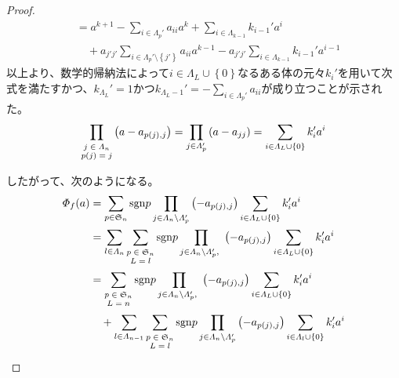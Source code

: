 \documentclass[dvipdfmx]{jsarticle}
\begin{document}
\begin{proof}
\begin{align*}
&= a^{k + 1} - \sum_{i \in \varLambda_{p}'} a_{ii}a^{k} + \sum_{i \in \varLambda_{k - 1}} {k_{i - 1}'a^{i}} \\
&\quad + a_{j'j'}\sum_{i \in \varLambda_{p}' \setminus \left\{ j' \right\}} a_{ii}a^{k - 1} - a_{j'j'}\sum_{i \in \varLambda_{k - 1}} {k_{i - 1}'a^{i - 1}}
\end{align*}
以上より、数学的帰納法によって$i \in \varLambda_{L} \cup \left\{ 0 \right\}$なるある体の元々$k_{i}'$を用いて次式を満たすかつ、$k_{\varLambda_{L}}' = 1$かつ$k_{\varLambda_{L} - 1}' = - \sum_{i \in \varLambda_{p}'} a_{ii}$が成り立つことが示された。
\begin{align*}
\prod_{\scriptsize \begin{matrix} j \in \varLambda_{n} \\ p(j) = j \end{matrix}} \left( a - a_{p(j),j} \right) = \prod_{j \in \varLambda_{p}'} \left( a - a_{jj} \right) = \sum_{i \in \varLambda_{L} \cup \left\{ 0 \right\}} {k_{i}'a^{i}}
\end{align*}\par
したがって、次のようになる。
\begin{align*}
\varPhi_{f}(a) &= \sum_{p \in \mathfrak{S}_{n}} {{\mathrm{sgn} }p\prod_{j \in \varLambda_{n} \setminus \varLambda_{p}'} \left( - a_{p(j),j} \right)\sum_{i \in \varLambda_{L} \cup \left\{ 0 \right\}} {k_{i}'a^{i}}}\\
&= \sum_{l \in \varLambda_{n}} {\sum_{\scriptsize \begin{matrix} p \in \mathfrak{S}_{n} \\ L = l \\\end{matrix}} {{\mathrm{sgn} }p\prod_{j \in \varLambda_{n} \setminus \varLambda_{p}' ,\ } \left( - a_{p(j),j} \right)\sum_{i \in \varLambda_{L} \cup \left\{ 0 \right\}} {k_{i}'a^{i}}}}\\
&= \sum_{\scriptsize \begin{matrix} p \in \mathfrak{S}_{n} \\ L = n\\\end{matrix}} {{\mathrm{sgn} }p\prod_{j \in \varLambda_{n} \setminus \varLambda_{p}' ,\ } \left( - a_{p(j),j} \right)\sum_{i \in \varLambda_{L} \cup \left\{ 0 \right\}} {k_{i}'a^{i}}} \\
&\quad + \sum_{l \in \varLambda_{n - 1}} {\sum_{\scriptsize \begin{matrix} p \in \mathfrak{S}_{n} \\ L = l \\\end{matrix}} {{\mathrm{sgn} }p\prod_{j \in \varLambda_{n} \setminus \varLambda_{p}' } \left( - a_{p(j),j} \right)\sum_{i \in \varLambda_{l} \cup \left\{ 0 \right\}} {k_{i}'a^{i}}}}

\end{align*}
\end{proof}
\end{document}
